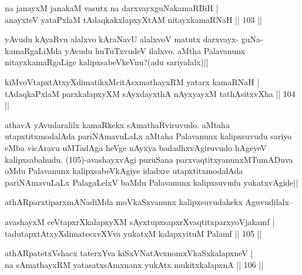\begin{shl}
na janayxM janakaM vasutx na darxvayxguNakamaRBiH |\\
anayxteV yataPxlaM tAdaqkakxlapxyXtAM nitayxkamaRNaH \hfill || 103 ||
\end{shl}

\begin{artha}
yAvudu kAyaRvu alalxvo kAraNavU alalxvoV matutx darxvayx- guNa-kamaRgaLiMda yAvudu huTuTxvudeV ilalxvo. aMtha Palavanunx nitayxkamaRgaLige kalipxsabeVkeVnu?(adu sariyalalx)||
\end{artha}

\begin{shl}
kiMvoVtapxtAtxyXdimatikxMcitAsxmathayxRM yatarx kamaRNaH |\\
tAdaqkaPxlaM parxkalapxyXM sAyxdayxthA nAyxyayxM tathA\s sitxvXha \hfill || 104 ||
\end{shl}

\begin{artha}
athavA yAvudaralilx kamaRkekx sAmathaRviruvudo. aMtaha utapxtitxmodalAda pariNAmavuLaLx aMtaha Palavanunx kalipxsuvudu sariyo eMba vicAravu uMTadAga heVge nAyxya badadhxvAgiruvudo hAgeyeV kalipxsabahudu. (105)-avashayxvAgi puruSana parxvaqtitxyanunxMTumADuva oMdu Palavanunx kalipxsabeVkAgiye idadxre utapxtitxmodalAda pariNAmavuLaLx PalagaLelxV baMdu Palavanunx kalipxsuvudu yukatxvAgide||
\end{artha}

\begin{artha}
athARparxtiparxmANadiMda moVkaSxvanunx kalipxsuvudakekx Aguvudilalx--
\end{artha}

\begin{shl}
avashayxM ceVtapxrXkalapxyXM sAyxtupxsapxrXvaqtitxparxyoVjakamf |\\
tadutapxtAtxyXdimatesxvXVva yukatxM kalapxyituM Palamf \hfill || 105 ||
\end{shl}

\begin{shl}
athARpatetxVshacx taterxYva kiSxVNatAvxnomxVkaSxkalapxneV |\\
na sAmathayxRM yatasatxsAmxnanx yukAtx mukitxkalapxnA \hfill || 106 ||
\end{shl}

